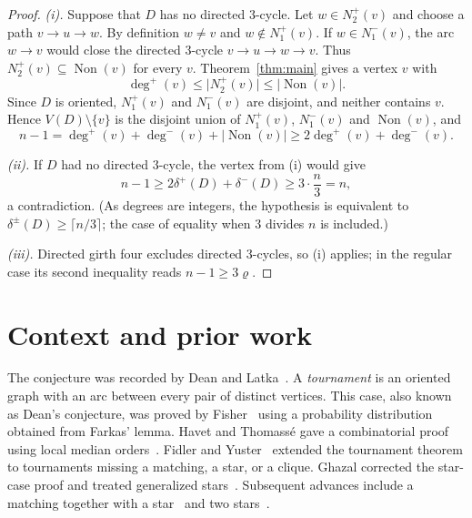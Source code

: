 \documentclass[11pt]{article}
\theoremstyle{remark}
\newcommand{\abs}[1]{\lvert #1\rvert}
\DeclareMathOperator{\Non}{Non}
\begin{document}
\begin{proof}
\emph{\textup{(i)}.} Suppose that \(D\) has no directed \(3\)-cycle. Let
\(w\in N_2^+(v)\) and choose a path \(v\to u\to w\). By definition
\(w\ne v\) and \(w\notin N_1^+(v)\). If \(w\in N_1^-(v)\), the arc
\(w\to v\) would close the directed \(3\)-cycle $v\to u\to w\to v$. Thus
\(N_2^+(v)\subseteq \Non(v)\) for every \(v\). Theorem~\ref{thm:main}
gives a vertex $v$ with
\[
 \deg^+(v)\leq\abs{N_2^+(v)}\leq\abs{\Non(v)}.
\]
Since \(D\) is oriented, $N_1^+(v)$ and $N_1^-(v)$ are disjoint, and neither
contains $v$. Hence $V(D)\setminus\{v\}$ is the disjoint union of
$N_1^+(v)$, $N_1^-(v)$ and $\Non(v)$, and
\[
 n-1=\deg^+(v)+\deg^-(v)+\abs{\Non(v)}
 \geq 2\deg^+(v)+\deg^-(v).
\]

\emph{\textup{(ii)}.} If $D$ had no directed \(3\)-cycle, the vertex from
\textup{(i)} would give
\[
 n-1\geq2\delta^+(D)+\delta^-(D)\geq 3\cdot\frac n3= n,
\]
a contradiction. (As degrees are integers, the hypothesis is equivalent to
\(\delta^\pm(D)\geq\lceil n/3\rceil\); the case of equality when \(3\)
divides \(n\) is included.)

\emph{\textup{(iii)}.} Directed girth four excludes directed
\(3\)-cycles, so \textup{(i)} applies; in the regular case its second
inequality reads \(n-1\geq3\varrho\).
\end{proof}

\section{Context and prior work}\label{sec:context}

The conjecture was recorded by Dean and Latka~\cite{DeanLatka1995}.
A \emph{tournament} is an oriented graph with an arc between every pair of
distinct vertices. This case, also known as Dean's conjecture, was proved
by Fisher~\cite{Fisher1996} using a probability distribution obtained from
Farkas' lemma. Havet and Thomass\'e gave a combinatorial proof using
local median orders~\cite{HavetThomasse2000}. Fidler and
Yuster~\cite{FidlerYuster2007} extended the tournament theorem to
tournaments missing a matching, a star, or a clique. Ghazal corrected the
star-case proof and treated generalized stars~\cite{Ghazal2012}.
Subsequent advances include a matching together with a
star~\cite{DaraFrancisJacobNarayanan2022} and two
stars~\cite{DaamouchAlMninyGhazal2025}.
\end{document}
